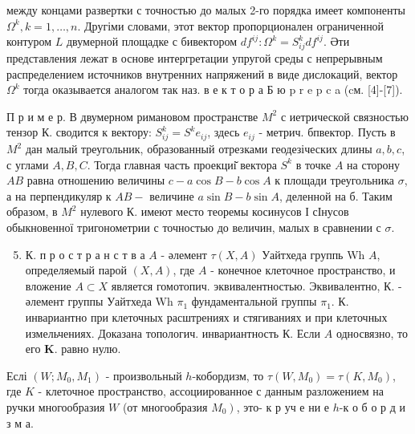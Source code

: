 \documentclass[10pt]{article}
\begin{document}
между концами развертки с точностью до малых 2-го порядка имеет компоненты $\Omega^{k}, k=1, \ldots, n$. Другіми словами, этот вектор пропорционален ограниченной контуром $L$ двумерной площадке с бивектором $d f^{i j}: \Omega^{k}=S_{i j}^{k} d f^{i j}$. Әти представления лежат в основе интергретации упругой среды с непрерывным распределением источников внутренних напряжений в виде дислокаций, вектор $\Omega^{k}$ тогда оказывается аналогом так наз. в е к т о р а Б ю p r e p c a (cм. [4]-[7]).



П р и м е р. В двумерном римановом пространстве $M^{2}$ с иетрической связностью тензор К. сводится к вектору: $S_{i j}^{k}=S^{k} e_{i j}$, здесь $e_{i j}$ - метрич. бпвектор. Пусть в $M^{2}$ дан малый треугольник, образованный отрезками геодезіческих длины $a, b, c$, с углами $A, B, C$. Тогда главная часть проекциі̆ вектора $S^{k}$ в точке $A$ на сторону $A B$ равна отношению величины $c-a \cos B-b \cos A$ к площади треугольника $\sigma$, а на перпендикуляр к $A B-$ величине $a \sin B-b \sin A$, деленной на б. Таким образом, в $M^{2}$ нулевого $К$. имеют место теоремы косинусов І сІнусов обыкновенної тригонометрии с точностью до величин, малых в сравнении с $\sigma$.



\begin{enumerate}

  \setcounter{enumi}{4}

  \item К. п р о с т р а н с т в а $A$ - әлемент $\tau(X, A)$ Уайтхеда группь Wh $A$, определяемый парой $(X, A)$, где $A$ - конечное клеточное пространство, и вложение $A \subset X$ является гомотопич. эквивалентностью. Эквивалентно, К. - әлемент группы Уайтхеда Wh $\pi_{1}$ фундаментальной группы $\pi_{1}$. К. инвариантно при клеточных расштрениях и стягиваниях и при клеточных измельчениях. Доказана топологич. инвариантность К. Если $A$ односвязно, то его $\mathbf{K}$. равно нулю.

\end{enumerate}



Еслі $\left(W ; M_{0}, M_{1}\right)$ - произвольный $h$-кобордизм, то $\tau\left(W, M_{0}\right)=\tau\left(K, M_{0}\right)$, где $K$ - клеточное пространство, ассоциированное с данным разложением на ручки многообразия $W$ (от многообразия $\left.M_{0}\right)$, это- к р уч е ни е $h$-к о б о р д и з м а.
\end{document}
